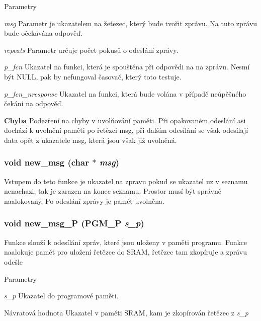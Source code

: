 \begin{DoxyParams}{Parametry}
\item[{\em msg}]Parametr je ukazatelem na žeťezec, který bude tvořit zprávu. Na tuto zprávu bude očekávána odpověď.\item[{\em repeats}]Parametr určuje počet pokusů o odeslání zprávy.\item[{\em p\_\-fcn}]Ukazatel na funkci, která je spouštěna při odpovědi na na zprávu. Nesmí být NULL, pak by nefungoval časovač, který toto testuje.\item[{\em p\_\-fcn\_\-nresponse}]Ukazatel na funkci, která bude volána v případě neúpěšného čekání na odpověď.\end{DoxyParams}
\begin{Desc}
\item[{\bf Chyba}]Podezření na chyby v uvolňování paměti. Při opakovaném odeslání asi dochází k uvolnění paměti po řetězci msg, při dalším odesílání se však odesílají data opět z ukazatele msg, která jsou však již uvolněná.\end{Desc}
\subsubsection[{new\_\-msg}]{\setlength{\rightskip}{0pt plus 5cm}void new\_\-msg (char $\ast$ {\em msg})}\label{usart_8h_af7f7e8050594c5346c22172e19d3c193}
Vstupem do teto funkce je ukazatel na zpravu pokud se ukazatel uz v seznamu nenachazi, tak je zarazen na konec seznamu. Prostor musí být správně naalokovaný. Po odeslání zprávy je paměť uvolněna. 
\subsubsection[{new\_\-msg\_\-P}]{\setlength{\rightskip}{0pt plus 5cm}void new\_\-msg\_\-P (PGM\_\-P {\em s\_\-p})}\label{usart_8h_a2da7b3916466fa7fbf44b68406ee9b76}
Funkce slouží k odesílání zpráv, které jsou uloženy v paměti programu. Funkce naalokuje paměť pro uložení řetězce do SRAM, řetězec tam zkopíruje a zprávu odešle 
\begin{DoxyParams}{Parametry}
\item[{\em s\_\-p}]Ukazatel do programové paměti. \end{DoxyParams}
\begin{DoxyReturn}{Návratová hodnota}
Ukazatel v paměti SRAM, kam je zkopírován řetězec z {\itshape s\_\-p\/} 
\end{DoxyReturn}
